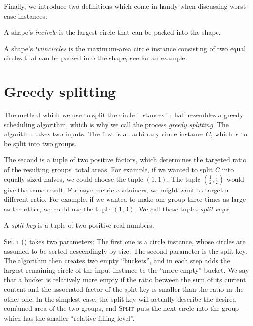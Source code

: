 \documentclass[a4paper,style=print,oneside,bibliography=totoc,nexus,lnum,extramargin]{tubsbook}
\begin{document}
Finally, we introduce two definitions which come in handy when discussing worst-case instances:

\begin{definition}
    A shape's \emph{incircle} is the largest circle that can be packed into the shape.
\end{definition}

\begin{definition}
    A shape's \emph{twincircles} is the maximum-area circle instance consisting of two equal circles that can be packed into the shape, see  for an example.%
\end{definition}


\section{Greedy splitting}

The method which we use to split the circle instances in half resembles a greedy scheduling algorithm, which is why we call the process \emph{greedy splitting}. The algorithm takes two inputs: The first is an arbitrary circle instance $C$, which is to be split into two groups.

The second is a tuple of two positive factors, which determines the targeted ratio of the resulting groups' total areas. For example, if we wanted to split $C$ into equally sized halves, we could choose the tuple $(1,1)$. The tuple $(\frac 1 2,\frac 1 2)$ would give the same result.
For asymmetric containers, we might want to target a different ratio. For example, if we wanted to make one group three times as large as the other, we could use the tuple $(1,3)$. We call these tuples \emph{split keys}:

\begin{definition}
    A \emph{split key} is a tuple of two positive real numbers.
\end{definition}

\textsc{Split} () takes two parameters: The first one is a circle instance, whose circles are assumed to be sorted descendingly by size. The second parameter is the split key. The algorithm then creates two empty “buckets”, and in each step adds the largest remaining circle of the input instance to the “more empty” bucket. We say that a bucket is relatively more empty if the ratio between the sum of its current content and the associated factor of the split key is smaller than the ratio in the other one.
In the simplest case, the split key will actually describe the desired combined area of the two groups, and \textsc{Split} puts the next circle into the group which has the smaller “relative filling level”.
\end{document}
